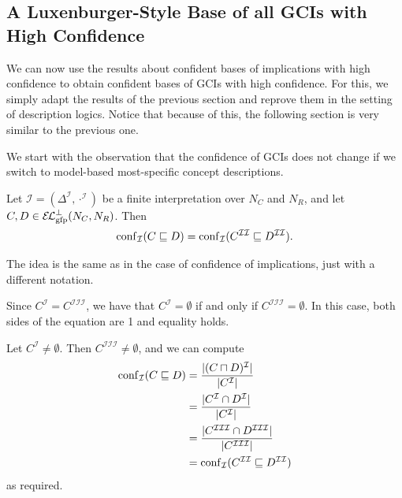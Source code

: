 \subsection{A Luxenburger-Style Base of all GCIs with High Confidence}
\label{sec:first-base}

We can now use the results about confident bases of implications with high confidence to
obtain confident bases of GCIs with high confidence.  For this, we simply adapt the
results of the previous section and reprove them in the setting of description logics.
Notice that because of this, the following section is very similar to the previous one.

We start with the observation that the confidence of GCIs does not change if we switch to
model-based most-specific concept descriptions.

\begin{Lemma}
  \label{lem:confidence-stays-under-mmsc}
  Let $\mathcal{I} = (\Delta^{\mathcal{I}}, \cdot^{\mathcal{I}})$ be a finite
  interpretation over $N_C$ and $N_R$, and let $C, D \in \ELgfpbot(N_C, N_R)$.  Then
  \begin{equation*}
    \operatorname{conf}_{\mathcal{I}}( C \sqsubseteq D ) = \operatorname{conf}_{\mathcal{I}}(
    C^{\mathcal{I}\mathcal{I}} \sqsubseteq D^{\mathcal{I}\mathcal{I}}).
  \end{equation*}
\end{Lemma}
\begin{Proof}
  The idea is the same as in the case of confidence of implications, just with a different
  notation.

  Since $C^{\mathcal{I}} = C^{\mathcal{I}\mathcal{I}\mathcal{I}}$, we have that
  $C^{\mathcal{I}} = \emptyset$ if and only if $C^{\mathcal{I}\mathcal{I}\mathcal{I}} =
  \emptyset$.  In this case, both sides of the equation are 1 and equality holds.

  Let $C^{\mathcal{I}} \neq \emptyset$.  Then $C^{\mathcal{I}\mathcal{I}\mathcal{I}} \neq
  \emptyset$, and we can compute
  \begin{align*}
    \operatorname{conf}_{\mathcal{I}}( C \sqsubseteq D )
    &= \frac{ \lvert (C \sqcap D)^{\mathcal{I}} \rvert }{ \lvert C^{\mathcal{I}} \rvert } \\
    &= \frac{ \lvert C^{\mathcal{I}} \cap D^{\mathcal{I}} \rvert }{ \lvert C^{\mathcal{I}} \rvert }
    \\
    &= \frac{ \lvert C^{\mathcal{I}\mathcal{I}\mathcal{I}} \cap
        D^{\mathcal{I}\mathcal{I}\mathcal{I}} \rvert }{ \lvert
        C^{\mathcal{I}\mathcal{I}\mathcal{I}} \rvert } \\
    &= \operatorname{conf}_{\mathcal{I}}( C^{\mathcal{I}\mathcal{I}} \sqsubseteq
    D^{\mathcal{I}\mathcal{I}} )
  \end{align*}
  as required.
\end{Proof}

